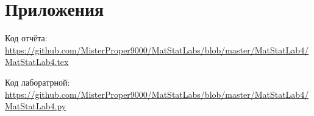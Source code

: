 \documentclass[a4]{article}
\begin{document}
\section{Приложения}


Код отчёта:\; \url{https://github.com/MisterProper9000/MatStatLabs/blob/master/MatStatLab4/MatStatLab4.tex}

Код лаборатрной:\; \url{https://github.com/MisterProper9000/MatStatLabs/blob/master/MatStatLab4/MatStatLab4.py}
\end{document}
